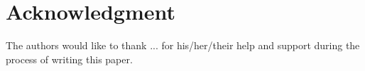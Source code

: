 \section*{Acknowledgment}
The authors would like to thank ... for his/her/their help and support during the process of writing this paper. \cite{webpage, FundConDep,exampleofjournalarticle,exampleofconferencepaper}